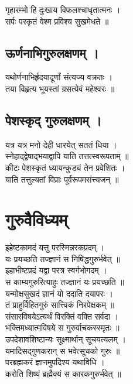 गृहारम्भो हि दुःखाय विफलश्चाधृतात्मनः ।\\[-2mm]
सर्पः परकृतं वेश्म प्रविश्य सुखमेधते ॥\\

\subsection{ऊर्णनाभिगुरुलक्षणम् ।}

यथोर्णनाभिर्हृदयादूर्णां संत्यज्य वक्रतः ।\\[-2mm]
तया विहृत्य भूयस्तां ग्रसत्येवं महेश्वरः ॥\\

\subsection{पेशस्कृद् गुरुलक्षणम् ।}

यत्र यत्र मनो देही धारयेत् सततं धिया ।\\[-2mm]
स्नेहाद्द्वेषाद्भयाद्वापि याति तत्तत्स्वरूपताम्  ॥\\
कीटः पेशस्कृतं ध्यायन्कुड्यं तेन प्रवेशितः ।\\[-2mm]
याति तत्तुल्यतां विप्राः पूर्वरूपमसंत्त्यजन् ॥\\

\section{गुरुवैविध्यम्}

इहेष्टकामदं यत्तु परस्मिन्नरकप्रदम् ।\\[-2mm]
यः प्रयच्छति तज्ज्ञानं स निषिद्धगुरुर्भवेत् ॥\\
इहाभीष्टप्रदं यद्वा परत्र स्वर्गभोगदम् ।\\[-2mm]
स काम्यगुरुरित्याहुः तज्ज्ञानं यः प्रयच्छति ॥\\
यन्मोक्षसुखदं ज्ञानं यो ददाति दयापरः ।\\[-2mm]
तं प्राहुर्विहितगुरुं सात्त्विकं निरपेक्षकम् ॥\\
संसारविषयेऽत्यर्थं विरक्तिं वक्ति सर्वदा ।\\[-2mm]
भक्तिमध्यात्मविषये स गुरुर्वाचकस्स्मृतः ॥\\
उपदेशावशिष्टान्यः सूक्ष्मार्थान् सूचयत्यलम् ।\\[-2mm]
यमादिसद्गुणकरान् स भवेत्सूचको गुरुः ॥\\
परब्रह्मकरं ज्ञानमुपदिश्य यथाविधि ।\\[-2mm]
करोति शिष्यं ब्रह्मैक्यं स कारकगुरुर्भवेत् ॥\\


